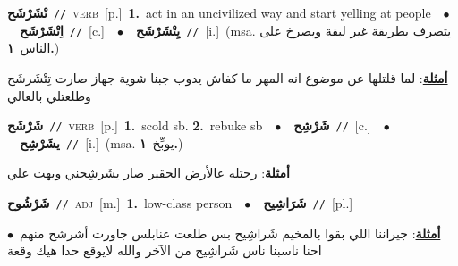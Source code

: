 \documentclass[10pt,a4paper,twoside]{article} %
\begin{document}
\begin{multicols}{2}
{\setlength\topsep{0pt}\textbf{\foreignlanguage{arabic}{تْشَرْشَح}}\ {\color{gray}\texttt{//}\color{black}}\ \textsc{verb}\ [p.]\ \textbf{1.}~act in an uncivilized way and start yelling at people\ \ $\bullet$\ \ \setlength\topsep{0pt}\textbf{\foreignlanguage{arabic}{اِتْشَرْشَح}}\ {\color{gray}\texttt{//}\color{black}}\ [c.]\ \ $\bullet$\ \ \setlength\topsep{0pt}\textbf{\foreignlanguage{arabic}{يِتْشَرْشَح}}\ {\color{gray}\texttt{//}\color{black}}\ [i.]\ \color{gray}(msa. \foreignlanguage{arabic}{يتصرف بطريقة غير لبقة ويصرخ على الناس}~\foreignlanguage{arabic}{\textbf{١.}})\color{black}\  \begin{flushright}\color{gray}\foreignlanguage{arabic}{\textbf{\underline{\foreignlanguage{arabic}{أمثلة}}}: لما قلتلها عن موضوع انه المهر ما كفاش يدوب جبنا شوية جهاز صارت تِتْشَرشَح  وطلعتلي بالعالي}\end{flushright}\color{black}} \vspace{2mm}

{\setlength\topsep{0pt}\textbf{\foreignlanguage{arabic}{شَرْشَح}}\ {\color{gray}\texttt{//}\color{black}}\ \textsc{verb}\ [p.]\ \textbf{1.}~scold sb.  \textbf{2.}~rebuke sb\ \ $\bullet$\ \ \setlength\topsep{0pt}\textbf{\foreignlanguage{arabic}{شَرْشِح}}\ {\color{gray}\texttt{//}\color{black}}\ [c.]\ \ $\bullet$\ \ \setlength\topsep{0pt}\textbf{\foreignlanguage{arabic}{يشَرْشِح}}\ {\color{gray}\texttt{//}\color{black}}\ [i.]\ \color{gray}(msa. \foreignlanguage{arabic}{يوبِّخ}~\foreignlanguage{arabic}{\textbf{١.}})\color{black}\  \begin{flushright}\color{gray}\foreignlanguage{arabic}{\textbf{\underline{\foreignlanguage{arabic}{أمثلة}}}: رحتله عالأرض الحقير صار يشَرشِحني ويهت علي}\end{flushright}\color{black}} \vspace{2mm}

{\setlength\topsep{0pt}\textbf{\foreignlanguage{arabic}{شَرْشُوح}}\ {\color{gray}\texttt{//}\color{black}}\ \textsc{adj}\ [m.]\ \textbf{1.}~low-class person\ \ $\bullet$\ \ \setlength\topsep{0pt}\textbf{\foreignlanguage{arabic}{شَرَاشِيح}}\ {\color{gray}\texttt{//}\color{black}}\ [pl.]\  \begin{flushright}\color{gray}\foreignlanguage{arabic}{\textbf{\underline{\foreignlanguage{arabic}{أمثلة}}}: جيراننا اللي بقوا بالمخيم شَراشِيح بس طلعت عنابلس جاورت أشرشح منهم\ $\bullet$\ \  احنا ناسبنا ناس شَراشِيح من الآخر والله لايوقع حدا هيك وقعة}\end{flushright}\color{black}} \vspace{2mm}


\end{multicols}
\end{document}
